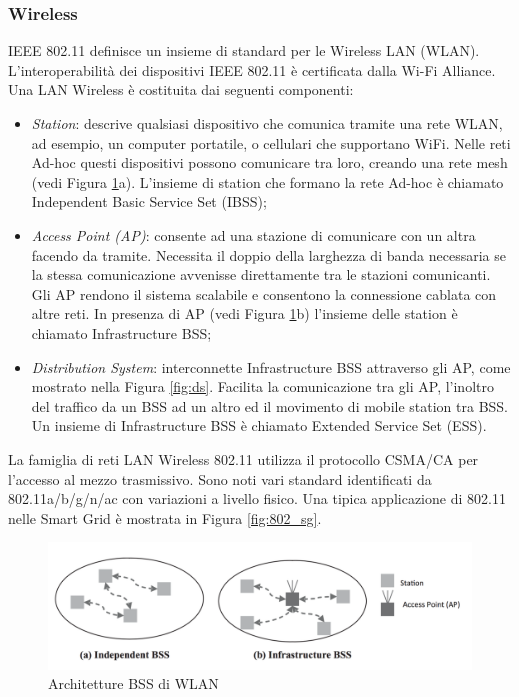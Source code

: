 \subsubsection{Wireless}
IEEE 802.11 definisce un insieme di standard per le Wireless LAN (WLAN). L'interoperabilità dei dispositivi IEEE 802.11 è certificata dalla Wi-Fi Alliance. Una LAN Wireless è costituita dai seguenti componenti:
\begin{itemize}
	\item\emph{Station}: descrive qualsiasi dispositivo che comunica tramite una rete WLAN, ad esempio, un computer portatile, o cellulari che supportano WiFi. Nelle reti Ad-hoc questi dispositivi possono comunicare tra loro, creando una rete mesh (vedi Figura \ref{fig:bss}a). L'insieme di station che formano la rete Ad-hoc è chiamato Independent Basic Service Set (IBSS);
	\item\emph{Access Point (AP)}: consente ad una stazione di comunicare con un altra facendo da tramite. Necessita il doppio della larghezza di banda necessaria se la stessa comunicazione avvenisse direttamente tra le stazioni comunicanti. Gli AP rendono il sistema scalabile e consentono la connessione cablata con altre reti. In presenza di AP (vedi Figura \ref{fig:bss}b) l'insieme delle station è chiamato Infrastructure BSS;
	\item\emph{Distribution System}: interconnette Infrastructure BSS attraverso gli AP, come mostrato nella Figura \ref{fig:ds}. Facilita la comunicazione tra gli AP, l'inoltro del traffico da un BSS ad un altro ed il movimento di mobile station tra BSS. Un insieme di Infrastructure BSS è chiamato Extended Service Set (ESS).
\end{itemize}
La famiglia di reti LAN Wireless 802.11 utilizza il protocollo CSMA/CA per l'accesso al mezzo trasmissivo. Sono noti vari standard identificati da 802.11a/b/g/n/ac con variazioni a livello fisico. Una tipica applicazione di 802.11 nelle Smart Grid è mostrata in Figura \ref{fig:802_sg}.
\vspace{20pt}
\begin{figure}[h]
	\centering
	\includegraphics[scale=0.250]{imgs/bss.png}
	\caption{Architetture BSS di WLAN} \label{fig:bss}
\end{figure}
